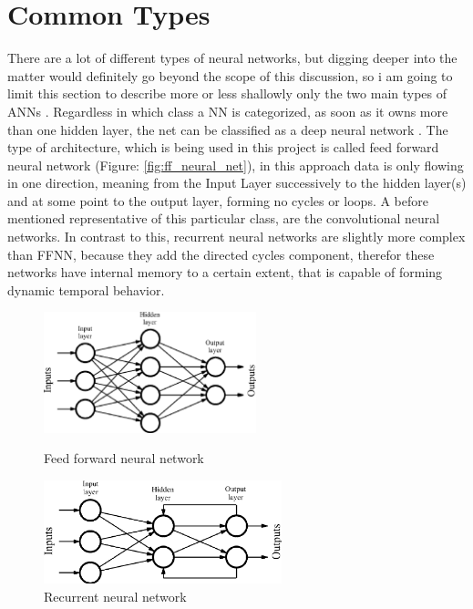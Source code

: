\section{Common Types}
There are a lot of different types of neural networks, but digging deeper into the matter would definitely go beyond the scope of this discussion, so i am going to limit this section to describe more or less shallowly only the two main types of ANNs \cite{nntutorial}. Regardless in which class a NN is categorized, as soon as it owns more than one hidden layer, the net can be classified as a deep neural network \cite{deep-learning-methods}. \newline
The type of architecture, which is being used in this project is called feed forward neural network (Figure: \ref{fig:ff_neural_net}), in this approach data is only flowing in one direction, meaning from the Input Layer successively to the hidden layer(s) and at some point to the output layer, forming no cycles or loops. A before mentioned representative of this particular class, are the convolutional neural networks.\newline
In contrast to this, recurrent neural networks are slightly more complex than FFNN, because they add the directed cycles component, therefor these networks have internal memory to a certain extent, that is capable of forming dynamic temporal behavior. 


\begin{figure}[H]
	
	\includegraphics[height=3.5cm]{images/feed_forward_neural_net.png}
	\caption{Feed forward neural network \cite{ffnn}}
	\label{fig:ff_neural_net}
	\endminipage
	\hfill
	\includegraphics[height=3cm]{images/recurrent_neural_net.png}
	\caption{Recurrent neural network \cite{rnn}}
	\label{fig:rec_neural_net}
	\endminipage
\end{figure}


